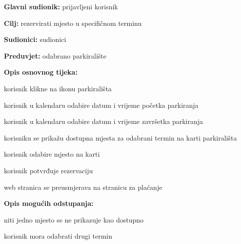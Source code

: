 \begin{packed_enum}
\begin{packed_item}
\begin{packed_item}
						\end{packed_item}
					\end{packed_item}
					
					\noindent {}
					\begin{packed_item}
						
						\item \textbf{Glavni sudionik: }prijavljeni korisnik
						\item  \textbf{Cilj:} rezervirati mjesto u specifičnom terminu
						\item  \textbf{Sudionici:} sudionici
						\item  \textbf{Preduvjet:} odabrano parkiralište
						\item  \textbf{Opis osnovnog tijeka:}
						
						\item[] \begin{packed_enum}
							
							\item korisnik klikne na ikonu parkirališta
							\item korisnik u kalendaru odabire datum i vrijeme početka parkiranja
							\item korisnik u kalendaru odabire datum i vrijeme završetka parkiranja 
							\item korisniku se prikažu dostupna mjesta za odabrani termin na karti parkirališta
							\item korisnik odabire mjesto na karti
							\item korisnik potvrđuje rezervaciju
							\item web stranica se preusmjerava na stranicu za plaćanje
						\end{packed_enum}
						
						\item  \textbf{Opis mogućih odstupanja:}
						
						\item[] \begin{packed_item}
							
							\item[4.a]niti jedno mjesto se ne prikazuje kao dostupno
							\item[] \begin{packed_enum}
								
								\item korisnik mora odabrati drugi termin
								
								
							\end{packed_enum}
							

\end{packed_item}
\end{packed_item}
\end{packed_enum}
